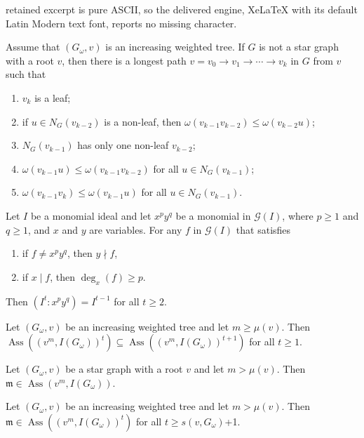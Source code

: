 \documentclass[10pt,a4paper]{amsart}
\DeclareMathOperator{\ass}{Ass}
\def\m {\mathfrak m}
\begin{document}
retained excerpt is pure ASCII, so the delivered engine, XeLaTeX with its default Latin Modern text font, reports no missing character.
\begin{lem}\label{path} Assume that $(G_\omega,v)$ is an increasing weighted tree. If $G$ is not a star  graph with a root $v$, then there is a longest path $v= v_0\to v_1\to\cdots\to v_k$ in $G$ from  $v$ such that
\begin{enumerate}
    \item $v_k$ is a leaf;
    \item if $u\in N_G(v_{k-2})$ is a non-leaf, then $\omega(v_{k-1}v_{k-2})\leqslant \omega(v_{k-2}u)$;
    \item $N_G(v_{k-1})$ has only one non-leaf $v_{k-2}$;
    \item $\omega(v_{k-1}u) \leqslant \omega(v_{k-1}v_{k-2})$ for all $u\in N_G(v_{k-1})$;
    \item $\omega(v_{k-1}v_k) \leqslant \omega(v_{k-1}u)$ for all $u\in N_G(v_{k-1})$.
\end{enumerate}
\end{lem}

\begin{lem}\label{dec-power} Let $I$ be a monomial ideal and let $x^py^q$ be a monomial in $\mathcal{G}(I)$, where $p \geqslant 1$ and $q\geqslant 1$, and $x$ and $y$ are variables. For any   $f$ in $\mathcal{G}(I)$ that satisfies 
\begin{enumerate}
    \item if  $f\ne x^py^q$, then $y\nmid f$,
    \item if  $x\mid f$, then $\deg_x(f)\geqslant p$.
\end{enumerate}
Then $(I^t \colon x^py^q)= I^{t-1}$ for all $t\geqslant 2$.
\end{lem}

\begin{lem} \label{inc-r-assoc} Let $(G_\omega,v)$ be an increasing weighted tree and let $m\geqslant\mu(v)$. Then  $\ass ((v^m,I(G_\omega))^t) \subseteq \ass ((v^m,I(G_\omega))^{t+1})$ for all $t\geqslant 1$.
\end{lem}

\begin{lem} \label{star} Let $(G_\omega,v)$ be a star graph with a root $v$ and let $m>\mu(v)$. Then  $\m\in \ass (v^m,I(G_\omega))$.
\end{lem}

\begin{lem} \label{sG1} Let $(G_\omega,v)$ be an increasing weighted tree and let $m > \mu(v)$. Then  $\m\in \ass((v^m,I(G_\omega))^t)$ for all $t\geqslant s(v,G_\omega)$+1.
\end{lem}
\end{document}

